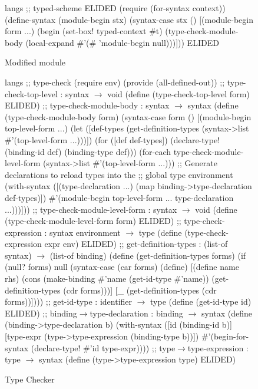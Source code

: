 \begin{schemeregion}
\begin{figure}[p!]
\begin{schemedisplay}
langs ;; typed-scheme
ELIDED
(require (for-syntax context))
(define-syntax (module-begin stx)
  (syntax-case stx ()
    [(module-begin form ...)
     (begin
       (set-box! typed-context #t)
       (type-check-module-body
	(local-expand #'(#%
		      'module-begin
		      null)))]))
ELIDED
\end{schemedisplay}
\caption{Modified  module}
\label{fig:new-ts-mod}
\end{figure}


\begin{figure}[p!]
\begin{schemedisplay}
langs ;; type-check
(require env)
(provide (all-defined-out))
;; type-check-top-level : syntax $\rightarrow$ void
(define (type-check-top-level form) ELIDED)
;; type-check-module-body : syntax $\rightarrow$ syntax
(define (type-check-module-body form)
  (syntax-case form ()
    [(module-begin top-level-form ...)
     (let ([def-types
	     (get-definition-types (syntax->list #'(top-level-form ...)))])
       (for ([def def-types])
	 (declare-type! (binding-id def) (binding-type def)))
       (for-each type-check-module-level-form
		 (syntax->list #'(top-level-form ...)))
       ;; Generate declarations to reload types into the
       ;; global type environment
       (with-syntax ([(type-declaration ...)
                      (map binding->type-declaration def-types)])
         #'(module-begin top-level-form ... type-declaration ...)))]))
;; type-check-module-level-form : syntax $\rightarrow$ void
(define (type-check-module-level-form form) ELIDED)
;; type-check-expression : syntax environment $\rightarrow$ type
(define (type-check-expression expr env) ELIDED)
;; get-definition-types : (list-of syntax) $\rightarrow$ (list-of binding)
(define (get-definition-types forms)
  (if (null? forms)
      null
      (syntax-case (car forms) (define)
	[(define name rhs)
	 (cons (make-binding #'name (get-id-type #'name))
	       (get-definition-types (cdr forms)))]
	[_ (get-definition-types (cdr forms))])))
;; get-id-type : identifier $\rightarrow$ type
(define (get-id-type id) ELIDED)
;; binding$\rightarrow$type-declaration : binding $\rightarrow$ syntax
(define (binding->type-declaration b)
  (with-syntax ([id (binding-id b)]
		[type-expr (type->type-expression (binding-type b))])
    #'(begin-for-syntax (declare-type! #'id type-expr))))
;; type$\rightarrow$type-expression : type $\rightarrow$ syntax
(define (type->type-expression type) ELIDED)
\end{schemedisplay}
\caption{Type Checker}
\label{fig:type-check-module}
\end{figure}


\end{schemeregion}
